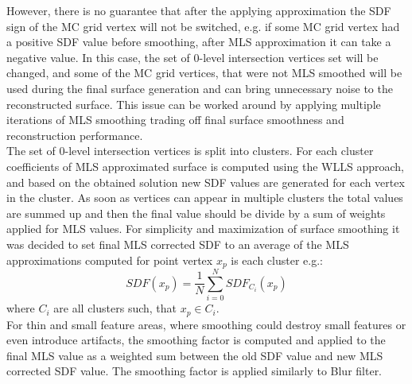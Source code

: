 However, there is no guarantee that after the applying approximation the SDF sign of the MC grid vertex will not be switched, e.g. if some MC grid vertex had a positive SDF value before smoothing, after MLS approximation it can take a negative value. In this case, the set of 0-level intersection vertices set will be changed, and some of the MC grid vertices, that were not MLS smoothed will be used during the final surface generation and can bring unnecessary noise to the reconstructed surface. This issue can be worked around by applying multiple iterations of MLS smoothing trading off final surface smoothness and reconstruction performance.\\

The set of 0-level intersection vertices is split into clusters. For each cluster coefficients of MLS approximated surface is computed using the WLLS approach, and based on the obtained solution new SDF values are generated for each vertex in the cluster. As soon as vertices can appear in multiple clusters the total values are summed up and then the final value should be divide by a sum of weights applied for MLS values. For simplicity and maximization of surface smoothing it was decided to set final MLS corrected SDF to an average of the MLS approximations computed for point vertex $x_p$ is each cluster e.g.:
\begin{equation}
	SDF(x_p) = \dfrac{1}{N} \sum_{i = 0}^N{SDF_{C_i}(x_p)}
\end{equation}
where $C_i$ are all clusters such, that $x_p \in C_i$.\\

For thin and small feature areas, where smoothing could destroy small features or even introduce artifacts, the smoothing factor is computed and applied to the final MLS value as a weighted sum between the old SDF value and new MLS corrected SDF value. The smoothing factor is applied similarly to Blur filter.\\

